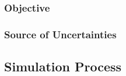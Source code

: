 \documentclass[letterpaper]{article}
\begin{document}
\subsubsection{Objective}
\subsubsection{Source of Uncertainties}

\subsection{Simulation Process}
\end{document}
